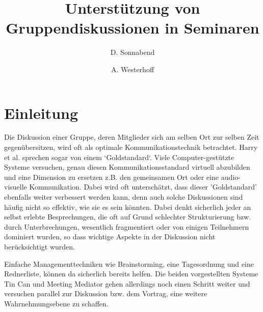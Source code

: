 \documentclass{seminarvorlage}
\begin{document}
\title{Unterstützung von Gruppendiskussionen in Seminaren}
\author{
  \alignauthor D. Sonnabend\\
    \and
  \alignauthor A. Westerhoff\\
}

\maketitle



\section{Einleitung}
Die Diskussion einer Gruppe, deren Mitglieder sich am selben Ort zur selben Zeit
gegenübersitzen, wird oft als optimale Kommunikationstechnik betrachtet. Harry
et al. \cite{HarGorSch2012} sprechen sogar von einem `Goldstandard`. Viele
Com\-puter-\-ge\-stützte Systeme versuchen, genau diesen
Kommunikationsstandard virtuell abzubilden und eine Dimension zu ersetzen z.B. den gemeinsamen
Ort oder eine audio-visuelle Kommunikation. Dabei wird oft unterschätzt,
dass dieser 'Goldstandard' ebenfalls weiter verbessert werden kann, denn auch
solche Diskussionen sind häufig nicht so effektiv, wie sie es sein könnten.
Dabei denkt sicherlich jeder an selbst erlebte Besprechungen, die oft auf Grund schlechter
Strukturierung bzw. durch Unterbrechungen, wesentlich fragmentiert oder
von einigen Teilnehmern dominiert wurden, so dass wichtige Aspekte in der
Diskussion nicht berücksichtigt wurden.

Einfache Managementtechniken wie Brainstorming, eine Tagesordnung und eine
Rednerliste, können da sicherlich bereits helfen.
Die beiden vorgestellten Systeme Tin Can und Meeting Mediator gehen allerdings
noch einen Schritt weiter und versuchen parallel zur Diskussion bzw. dem
Vortrag, eine weitere Wahrnehmungsebene zu schaffen.
\end{document}
